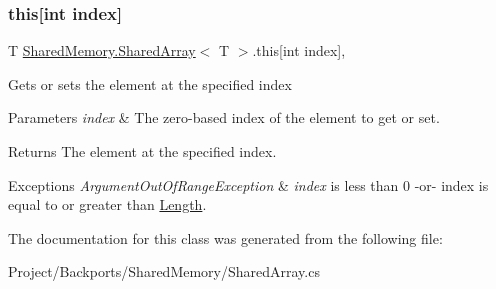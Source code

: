 \mbox{\label{class_shared_memory_1_1_shared_array_a77352ef262de87157ea17f60c0966f8a}} 
\subsubsection{\texorpdfstring{this[int index]}{this[int index]}}
{\footnotesize\ttfamily T \hyperlink{class_shared_memory_1_1_shared_array}{Shared\+Memory.\+Shared\+Array}$<$ T $>$.this\mbox{[}int index\mbox{]}\hspace{0.3cm}{\ttfamily [get]}, {\ttfamily [set]}}



Gets or sets the element at the specified index 


\begin{DoxyParams}{Parameters}
{\em index} & The zero-\/based index of the element to get or set.\\
\hline
\end{DoxyParams}
\begin{DoxyReturn}{Returns}
The element at the specified index.
\end{DoxyReturn}

\begin{DoxyExceptions}{Exceptions}
{\em Argument\+Out\+Of\+Range\+Exception} & {\itshape index}  is less than 0 -\/or-\/ index is equal to or greater than \hyperlink{class_shared_memory_1_1_shared_array_a0fc7647fef708e12caf94e7be58f2c3c}{Length}.\\
\hline
\end{DoxyExceptions}


The documentation for this class was generated from the following file\+:\begin{DoxyCompactItemize}
\item 
Project/\+Backports/\+Shared\+Memory/Shared\+Array.\+cs\end{DoxyCompactItemize}
